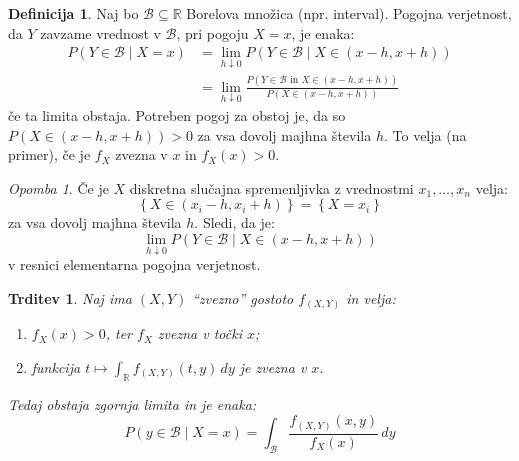 \documentclass[12pt]{book}
\theoremstyle{definition}
\newtheorem{definicija}{Definicija}
\theoremstyle{plain}
\theoremstyle{plain}
\newtheorem{trditev}{Trditev}
\theoremstyle{plain}
\theoremstyle{remark}
\newtheorem*{opomba}{Opomba}
\begin{document}
\begin{definicija}
    Naj bo $\mathcal{B} \subseteq \mathbb{R}$ Borelova množica (npr. interval). Pogojna verjetnost, da $Y$ zavzame vrednost v $\mathcal{B}$, pri pogoju $X=x$, je enaka:
    $$
    \begin{aligned}
        P(Y \in \mathcal{B} \mid X=x) & =\lim _{h \downarrow 0} P(Y \in \mathcal{B} \mid X \in(x-h, x+h)) \\
        & =\lim _{h \downarrow 0} \frac{P(Y \in \mathcal{B} \text { in } X \in(x-h, x+h))}{P(X \in(x-h, x+h))}
    \end{aligned}
    $$
    če ta limita obstaja. Potreben pogoj za obstoj je, da so $P(X \in(x-h, x+h))>0$ za vsa dovolj majhna števila $h$. To velja (na primer), če je $f_X$ zvezna v $x$ in $f_X(x)>0$. 
\end{definicija}

\begin{opomba}
    Če je $X$ diskretna slučajna spremenljivka z vrednostmi $x_1, \ldots, x_n$ velja: 
    $$
    \left\{X \in\left(x_i-h, x_i+h\right)\right\}=\left\{X=x_i\right\}
    $$ 
    za vsa dovolj majhna števila $h$. Sledi, da je:
    $$
    \lim _{h \downarrow 0} P(Y \in \mathcal{B} \mid X \in(x-h, x+h))
    $$ 
    v resnici elementarna pogojna verjetnost. 
\end{opomba}

\begin{trditev}
    Naj ima $(X,Y)$ “zvezno” gostoto $f_{(X,Y)}$ in velja:
    \begin{enumerate}
        \item $f_X(x) > 0$, ter $f_X$ zvezna v točki $x$;
        \item funkcija $t \mapsto \int_{\mathbb{R}} f_{(X, Y)}(t, y) \,d y$ je zvezna v $x$. 
    \end{enumerate}
    Tedaj obstaja zgornja limita in je enaka: 
    $$
    P(y \in \mathcal{B} \mid X=x)=\int_\mathcal{B} \frac{f_{(X, Y)}(x, y)}{f_X(x)} \,d y
    $$
\end{trditev}
\end{document}
